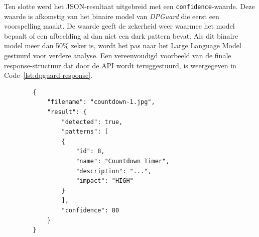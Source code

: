 \vspace{1em}

Ten slotte werd het JSON-resultaat uitgebreid met een \texttt{confidence}-waarde. Deze waarde is afkomstig van het binaire model van \textit{DPGuard} die eerst een voorspelling maakt. De waarde geeft de zekerheid weer waarmee het model bepaalt of een afbeelding al dan niet een dark pattern bevat. Als dit binaire model meer dan 50\% zeker is, wordt het pas naar het Large Language Model gestuurd voor verdere analyse. Een vereenvoudigd voorbeeld van de finale response-structuur dat door de API wordt teruggestuurd, is weergegeven in Code~\ref{lst:dpguard-response}.

\vspace{1em}

\begin{listing}[H]
    \begin{verbatim}
        {
            "filename": "countdown-1.jpg",
            "result": {
                "detected": true,
                "patterns": [
                {
                    "id": 8,
                    "name": "Countdown Timer",
                    "description": "...",
                    "impact": "HIGH"
                }
                ],
                "confidence": 80
            }
        }
    \end{verbatim}
    \caption[Voorbeeld van het JSON-resultaat van DPGuard]{Voorbeeld van het JSON-resultaat dat door DPGuard via de FastAPI-backend wordt teruggestuurd.}
    \label{lst:dpguard-response}
\end{listing}

